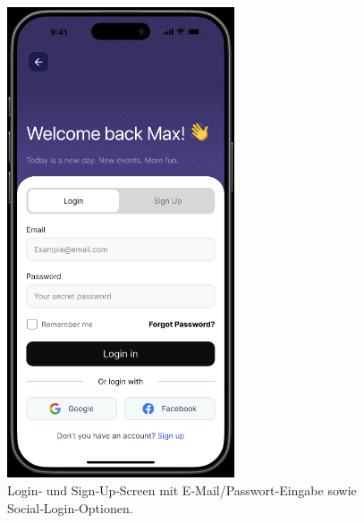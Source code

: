 \documentclass[11pt,a4paper]{article}
\begin{document}
\begin{figure}[h]
  \centering
  \includegraphics[width=0.6\textwidth]{image-2.png}
  \caption{Login‑ und Sign‑Up‑Screen mit E‑Mail/Passwort‑Eingabe sowie Social‑Login‑Optionen.}
  \label{fig:login}
\end{figure}
\end{document}
